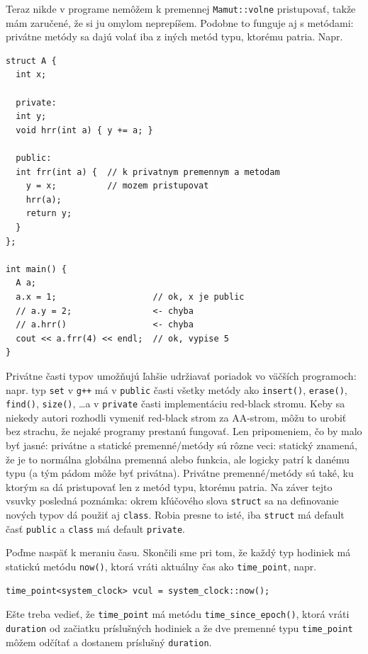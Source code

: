 \documentclass[10pt]{article}
\def\prg{\lstinline}
\def\ods{\vspace*{10pt}}
\begin{document}
{Teraz nikde v programe nemôžem k premennej {\tt Mamut::volne} pristupovať,
takže mám zaručené, že si ju omylom neprepíšem.
Podobne to funguje aj s metódami: privátne metódy sa dajú volať iba z iných
metód typu, ktorému patria. Napr.

\begin{lstlisting}
struct A {
  int x;

  private:
  int y;
  void hrr(int a) { y += a; }

  public:
  int frr(int a) {  // k privatnym premennym a metodam
    y = x;          // mozem pristupovat
    hrr(a);
    return y;
  }
};

int main() {
  A a;
  a.x = 1;                   // ok, x je public
  // a.y = 2;                <- chyba  
  // a.hrr()                 <- chyba
  cout << a.frr(4) << endl;  // ok, vypise 5
}
\end{lstlisting}

Privátne časti typov umožňujú ľahšie udržiavať poriadok vo väčších programoch: 
napr. typ \prg!set! v {\tt g++} má v \prg!public! časti všetky metódy ako 
\prg!insert()!, \prg!erase()!,
\prg!find()!, \prg!size()!, \ldots a v \prg!private! časti
implementáciu red-black stromu. Keby sa niekedy autori rozhodli vymeniť red-black
strom za AA-strom, môžu to urobiť bez strachu, že nejaké programy prestanú 
fungovať. 
Len pripomeniem, čo by malo byť jasné: privátne a statické premenné/metódy sú rôzne veci:
statický znamená, že je to normálna globálna premenná alebo funkcia, ale logicky patrí
k danému typu (a tým pádom môže byť privátna). Privátne premenné/metódy sú také, ku ktorým
sa dá pristupovať len z metód typu, ktorému patria.
Na záver tejto vsuvky posledná poznámka: okrem kľúčového slova 
\prg!struct! sa na definovanie nových typov dá použiť aj \prg!class!. Robia
presne to isté, iba \prg!struct! má default časť \prg!public! a \prg!class!
má default \prg!private!.

\ods
Poďme naspäť k meraniu času. 
Skončili sme pri tom, že každý typ hodiniek má statickú metódu
\prg!now()!, ktorá vráti aktuálny čas ako \prg!time_point!, napr.

\begin{lstlisting}
time_point<system_clock> vcul = system_clock::now();
\end{lstlisting}

Ešte treba vedieť, že \prg!time_point! má metódu \prg!time_since_epoch()!, ktorá
vráti \prg!duration! od začiatku príslušných hodiniek a že 
dve premenné typu \prg!time_point! môžem odčítať a dostanem 
príslušný \prg!duration!.

}
\end{document}
